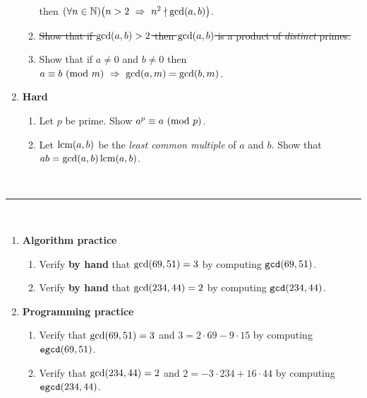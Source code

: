 \begin{enumerate}
\begin{enumerate}
{                then $\pn*{\forall n \in \N}\pn*{n > 2 \implies n^2 \ndivides \gcd\pn*{a, b}}$.}
            \item
                \sout{Show that if $\gcd\pn*{a, b} > 2$
                then $\gcd\pn*{a, b}$ is a product of \emph{distinct} primes.}
            \item
                Show that if $a \neq 0$ and $b \neq 0$
                then $\modulo{a}{b}{m} \implies \gcd\pn*{a, m} = \gcd\pn*{b, m}$.
        \end{enumerate}
    \item \textbf{Hard}
        \begin{enumerate}
            \item
                Let $p$ be prime. Show $\modulo{a^p}{a}{p}$.
            \item
                Let $\lcm\pn*{a, b}$ be the \emph{least common multiple} of $a$ and $b$.
                Show that $ab = \gcd\pn*{a, b}\lcm\pn*{a, b}$.
        \end{enumerate}
\end{enumerate}

~\\
\hrule
~\\

\begin{enumerate}
    \item \textbf{Algorithm practice}
        \begin{enumerate}
            \item
                Verify \textbf{by hand} that $\gcd\pn*{69, 51} = 3$
                by computing $\texttt{gcd}\pn*{69, 51}$.
            \item
                Verify \textbf{by hand} that $\gcd\pn*{234, 44} = 2$
                by computing $\texttt{gcd}\pn*{234, 44}$.
        \end{enumerate}
    \item \textbf{Programming practice}
        \begin{enumerate}
            \item
                Verify that $\gcd\pn*{69, 51} = 3$ and $3 = 2 \cdot 69 - 9 \cdot 15$
                by computing $\texttt{egcd}\pn*{69, 51}$.
            \item
                Verify that $\gcd\pn*{234, 44} = 2$ and $2 = -3 \cdot 234 + 16 \cdot 44$
                by computing $\texttt{egcd}\pn*{234, 44}$.
        \end{enumerate}
\end{enumerate}

